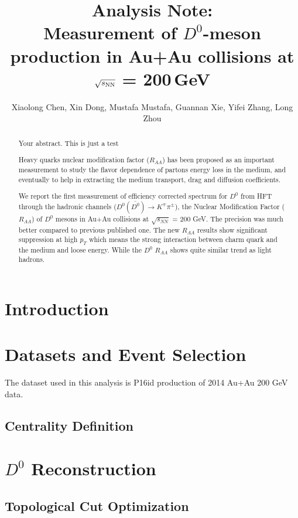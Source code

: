 \documentclass[a4paper]{article}
\title{Analysis Note: \\
Measurement of $D^0$-meson production in Au+Au collisions at $\sqrt{s_{\rm NN}}$ = 200\,GeV}
\author{Xiaolong Chen, Xin Dong, Mustafa Mustafa, Guannan Xie, Yifei Zhang, Long Zhou}
\begin{document}
\maketitle

\begin{abstract}
Your abstract.
This is just a test

Heavy quarks nuclear modification factor ($R_{AA}$) has been proposed as an important measurement to study the flavor dependence of partons energy loss in the medium, and eventually to help in extracting the medium transport, drag and diffusion coefficients.

We report the first measurement of efficiency corrected spectrum for $D^0$ from HFT through the hadronic channels ($D^0(\bar{D^0}) \rightarrow K^{\mp}\pi^{\pm}$), the Nuclear Modification Factor ($R_{AA}$) of $D^0$ mesons in Au+Au collisions at $\sqrt{s_{NN}}$ = 200 GeV. The precision was much better compared to previous published one. The new $R_{AA}$ results show significant suppression at high $p_T$ which means the strong interaction between charm quark and the medium and loose energy. While the $D^0$ $R_{AA}$ shows quite similar trend as light hadrons.

\end{abstract}

\section{Introduction}

\section{\label{dataset}Datasets and Event Selection}

The dataset used in this analysis is P16id production of 2014 Au+Au 200 GeV data.

\subsection{Centrality Definition}



\section{$D^0$ Reconstruction}

\subsection{Topological Cut Optimization}
\end{document}
